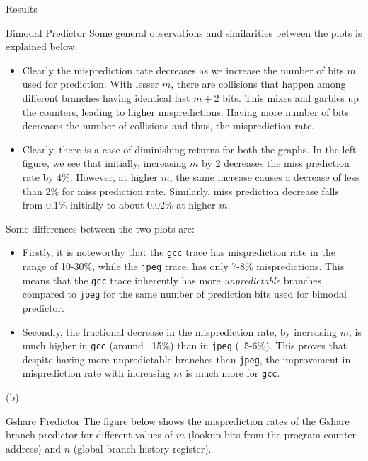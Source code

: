 \begin{section}{Results}
\begin{subsection}{Bimodal Predictor}
        Some general observations and similarities between the plots is explained below:
        \begin{itemize}
            \item Clearly the misprediction rate decreases as we increase the number of bits $m$ used for prediction. With lesser $m$, there are collisions that happen among different branches having identical last $m+2$ bits. This mixes and garbles up the counters, leading to higher mispredictions. Having more number of bits decreases the number of collisions and thus, the misprediction rate.
            \item Clearly, there is a case of diminishing returns for both the graphs. In the left figure, we see that initially, increasing $m$ by 2 decreases the miss prediction rate by 4\%. However, at higher $m$, the same increase causes a decrease of less than 2\% for miss prediction rate. Similarly, miss prediction decrease falls from 0.1\% initially to about 0.02\% at higher $m$.   %
        \end{itemize}

        Some differences between the two plots are:
        \begin{itemize}
            \item Firstly, it is noteworthy that the \texttt{gcc} trace has misprediction rate in the range of 10-30\%, while the \texttt{jpeg} trace, has only 7-8\% mispredictions. This means that the \texttt{gcc} trace inherently has more \textit{unpredictable} branches compared to \texttt{jpeg} for the same number of prediction bits used for bimodal predictor. 
            \item Secondly, the fractional decrease in the misprediction rate, by increasing $m$, is much higher in \texttt{gcc} (around ~15\%) than in \texttt{jpeg} (~5-6\%). This proves that despite having more unpredictable branches than \texttt{jpeg}, the improvement in misprediction rate with increasing $m$ is much more for \texttt{gcc}. 
        \end{itemize}


        \begin{center}
            (b)
        \end{center}
    \end{subsection}

    \begin{subsection}{Gshare Predictor}
        The figure below shows the misprediction rates of the Gshare branch predictor for different values of $m$ (lookup bits from the program counter address) and $n$ (global branch history register).



\end{subsection}
\end{section}

